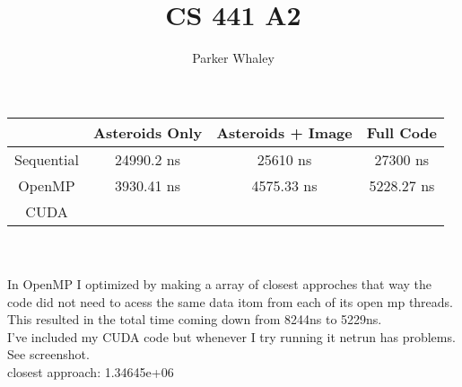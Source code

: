 \documentclass[11pt,a4paper]{article}
\author{Parker Whaley}
\title{CS 441 A2}
\begin{document}
\maketitle
\begin{tabular}{| c | c | c | c |}
\hline
& Asteroids Only & Asteroids + Image & Full Code\\
\hline
Sequential & 24990.2 ns & 25610 ns & 27300 ns\\
\hline
OpenMP & 3930.41 ns & 4575.33 ns & 5228.27 ns\\
\hline
CUDA &  &  & \\
\hline


\end{tabular}\\\\

In OpenMP I optimized by making a array of closest approches that way the code did not need to acess the same data itom from each of its open mp threads.  This resulted in the total time coming down from 8244ns to 5229ns.\\

I've included my CUDA code but whenever I try running it netrun has problems.  See screenshot.\\


closest approach: 1.34645e+06
\end{document}
